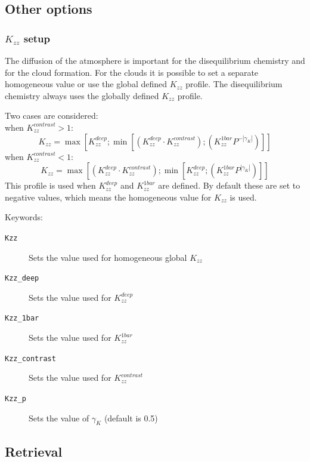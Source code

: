 \documentclass[12pt]{article}
\begin{document}
\subsection{Other options}

\subsubsection{$K_{zz}$ setup}
The diffusion of the atmosphere is important for the disequilibrium chemistry and for the cloud formation. For the clouds it is possible to set a separate homogeneous value or use the global defined $K_{zz}$ profile. The disequilibrium chemistry always uses the globally defined $K_{zz}$ profile.

Two cases are considered:\\
when $K_{zz}^{contrast} > 1$:
\begin{equation}
K_{zz}=\max\left[ K_{zz}^{deep} ; \min\left[ \left(K_{zz}^{deep}\cdot K_{zz}^{contrast} \right) ; \left(K_{zz}^{1bar} P^{-|\gamma_{K}|} \right) \right] \right]
\end{equation}
when $K_{zz}^{contrast} < 1$:
\begin{equation}
K_{zz}=\max\left[ \left(K_{zz}^{deep}\cdot K_{zz}^{contrast} \right) ; \min\left[ K_{zz}^{deep} ; \left(K_{zz}^{1bar} P^{|\gamma_{K}|} \right) \right] \right]
\end{equation}
This profile is used when $K_{zz}^{deep}$ and $K_{zz}^{1bar}$ are defined. By default these are set to negative values, which means the homogeneous value for $K_{zz}$ is used.

Keywords:
\begin{description}
\item[\texttt{Kzz}]
Sets the value used for homogeneous global $K_{zz}$
\item[\texttt{Kzz\_deep}]
Sets the value used for $K_{zz}^{deep}$
\item[\texttt{Kzz\_1bar}]
Sets the value used for $K_{zz}^{1bar}$
\item[\texttt{Kzz\_contrast}]
Sets the value used for $K_{zz}^{contrast}$
\item[\texttt{Kzz\_p}]
Sets the value of $\gamma_K$ (default is 0.5)
\end{description}



\subsection{Retrieval}
\end{document}
